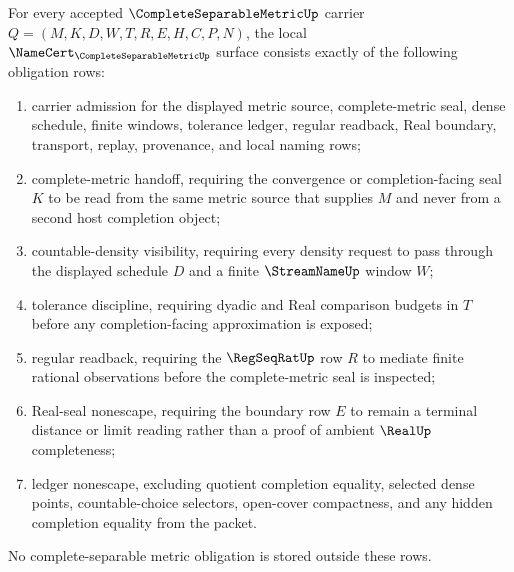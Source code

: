 \begin{theorem}\label{thm:complete-separable-metric-namecert-obligations}
For every accepted $\CompleteSeparableMetricUp$ carrier $Q=(M,K,D,W,T,R,E,H,C,P,N)$, the local $\NameCert_{\CompleteSeparableMetricUp}$ surface consists exactly of the following obligation rows:
\begin{enumerate}
\item carrier admission for the displayed metric source, complete-metric seal, dense schedule, finite windows, tolerance ledger, regular readback, Real boundary, transport, replay, provenance, and local naming rows;
\item complete-metric handoff, requiring the convergence or completion-facing seal $K$ to be read from the same metric source that supplies $M$ and never from a second host completion object;
\item countable-density visibility, requiring every density request to pass through the displayed schedule $D$ and a finite $\StreamNameUp$ window $W$;
\item tolerance discipline, requiring dyadic and Real comparison budgets in $T$ before any completion-facing approximation is exposed;
\item regular readback, requiring the $\RegSeqRatUp$ row $R$ to mediate finite rational observations before the complete-metric seal is inspected;
\item Real-seal nonescape, requiring the boundary row $E$ to remain a terminal distance or limit reading rather than a proof of ambient $\RealUp$ completeness;
\item ledger nonescape, excluding quotient completion equality, selected dense points, countable-choice selectors, open-cover compactness, and any hidden completion equality from the packet.
\end{enumerate}
No complete-separable metric obligation is stored outside these rows.
\end{theorem}
